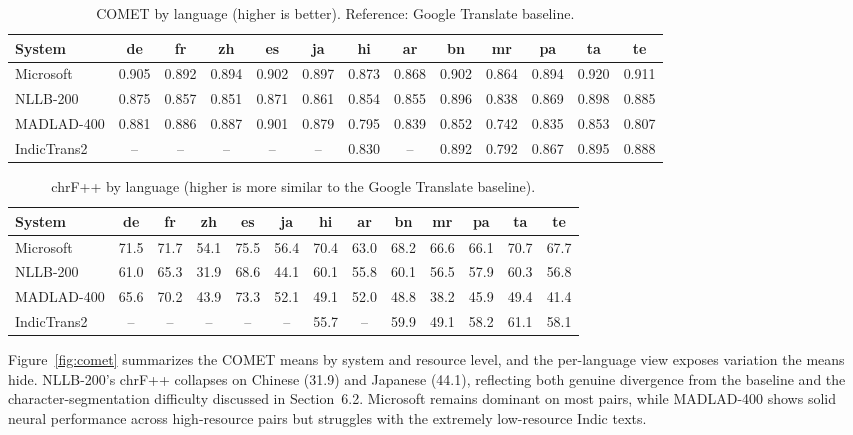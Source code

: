 \documentclass[pdflatex,sn-mathphys-num]{sn-jnl}
\begin{document}
\begin{table}[h]
\centering
\caption{COMET by language (higher is better). Reference: Google Translate baseline.}\label{tab:comet_lang}
\tiny
\setlength{\tabcolsep}{1.5pt}
\begin{tabular}{@{} p{1.8cm} c c c c c c c c c c c c @{}}
\toprule
System & de & fr & zh & es & ja & hi & ar & bn & mr & pa & ta & te \\
\midrule
Microsoft & 0.905 & 0.892 & 0.894 & 0.902 & 0.897 & 0.873 & 0.868 & 0.902 & 0.864 & 0.894 & 0.920 & 0.911 \\
NLLB-200 & 0.875 & 0.857 & 0.851 & 0.871 & 0.861 & 0.854 & 0.855 & 0.896 & 0.838 & 0.869 & 0.898 & 0.885 \\
MADLAD-400 & 0.881 & 0.886 & 0.887 & 0.901 & 0.879 & 0.795 & 0.839 & 0.852 & 0.742 & 0.835 & 0.853 & 0.807 \\
IndicTrans2 & -- & -- & -- & -- & -- & 0.830 & -- & 0.892 & 0.792 & 0.867 & 0.895 & 0.888 \\
\bottomrule
\end{tabular}
\end{table}

\begin{table}[h]
\centering
\caption{chrF++ by language (higher is more similar to the Google Translate baseline).}\label{tab:chrf_lang}
\tiny
\setlength{\tabcolsep}{1.5pt}
\begin{tabular}{@{} p{1.8cm} c c c c c c c c c c c c @{}}
\toprule
System & de & fr & zh & es & ja & hi & ar & bn & mr & pa & ta & te \\
\midrule
Microsoft & 71.5 & 71.7 & 54.1 & 75.5 & 56.4 & 70.4 & 63.0 & 68.2 & 66.6 & 66.1 & 70.7 & 67.7 \\
NLLB-200 & 61.0 & 65.3 & 31.9 & 68.6 & 44.1 & 60.1 & 55.8 & 60.1 & 56.5 & 57.9 & 60.3 & 56.8 \\
MADLAD-400 & 65.6 & 70.2 & 43.9 & 73.3 & 52.1 & 49.1 & 52.0 & 48.8 & 38.2 & 45.9 & 49.4 & 41.4 \\
IndicTrans2 & -- & -- & -- & -- & -- & 55.7 & -- & 59.9 & 49.1 & 58.2 & 61.1 & 58.1 \\
\bottomrule
\end{tabular}
\end{table}

Figure~\ref{fig:comet} summarizes the COMET means by system and resource level, and the per-language view exposes variation the means hide. NLLB-200's chrF++ collapses on Chinese (31.9) and Japanese (44.1), reflecting both genuine divergence from the baseline and the character-segmentation difficulty discussed in Section~6.2. Microsoft remains dominant on most pairs, while MADLAD-400 shows solid neural performance across high-resource pairs but struggles with the extremely low-resource Indic texts.
\end{document}
